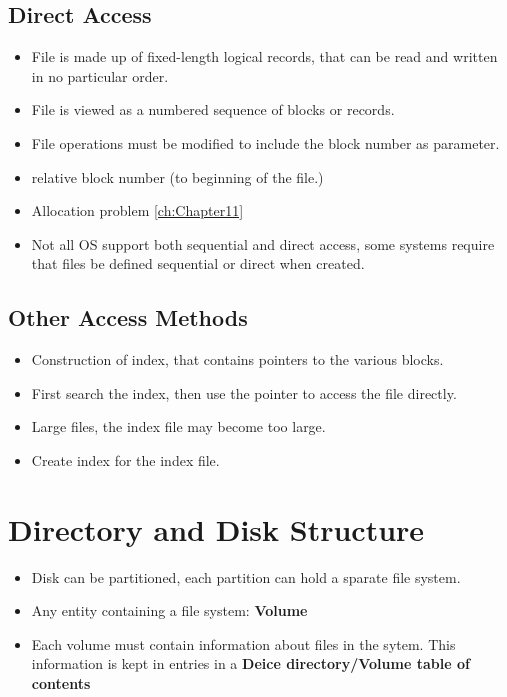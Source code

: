 \documentclass[10pt]{report}
\begin{document}
		\subsection{Direct Access}
			\begin{itemize}
					\item File is made up of fixed-length logical records, that can be read and written in no particular order.
					\item File is viewed as a numbered sequence of blocks or records.
					\item File operations must be modified to include the block number as parameter.
					\item relative block number (to beginning of the file.)
					\item Allocation problem \autoref{ch:Chapter11}
					\item Not all OS support both sequential and direct access, some systems require that files be defined sequential or direct when created.
			\end{itemize}

		\subsection{Other Access Methods}
			\begin{itemize}
					\item Construction of index, that contains pointers to the various blocks.
					\item First search the index, then use the pointer to access the file directly.
					\item Large files, the index file may become too large.
					\item Create index for the index file.
			\end{itemize}

	\section{Directory and Disk Structure}
		\begin{itemize}
				\item Disk can be partitioned, each partition can hold a sparate file system.
				\item Any entity containing a file system: \textbf{Volume}
				\item Each volume must contain information about files in the sytem. This information is kept in entries in a \textbf{Deice directory/Volume table of contents}
		\end{itemize}
\end{document}

